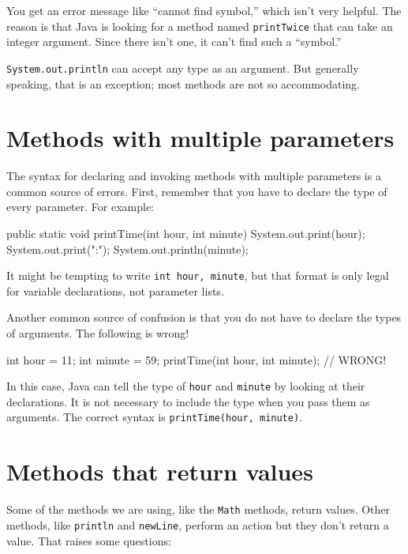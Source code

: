 You get an error message like ``cannot find symbol,'' which isn't very helpful.
The reason is that Java is looking for a method named {\tt printTwice} that can take an integer argument.
Since there isn't one, it can't find such a ``symbol.''

{\tt System.out.println} can accept any type as an argument.
But generally speaking, that is an exception; most methods are not so accommodating.


\section{Methods with multiple parameters}
\label{time}


The syntax for declaring and invoking methods with multiple parameters is a common source of errors.
First, remember that you have to declare the type of every parameter.
For example:

\begin{code}
    public static void printTime(int hour, int minute) {
        System.out.print(hour);
        System.out.print(":");
        System.out.println(minute);
    }
\end{code}

It might be tempting to write {\tt int hour, minute}, but that format is only legal for variable declarations, not parameter lists.

Another common source of confusion is that you do not have to declare the types of arguments.
The following is wrong!

\begin{code}
    int hour = 11;
    int minute = 59;
    printTime(int hour, int minute);   // WRONG!
\end{code}

In this case, Java can tell the type of {\tt hour} and {\tt minute} by looking at their declarations.
It is not necessary to include the type when you pass them as arguments.
The correct syntax is {\tt printTime(hour, minute)}.


\section{Methods that return values}


Some of the methods we are using, like the {\tt Math} methods, return values.
Other methods, like {\tt println} and {\tt newLine}, perform an action but they don't return a value.
That raises some questions:

